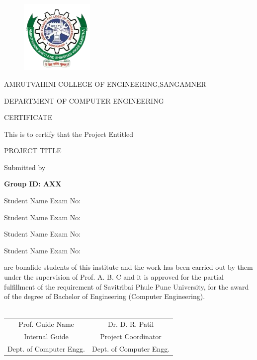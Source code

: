 \documentclass[oneside,a4paper,12pt]{report}
\begin{document}
\newpage



\begin{figure}[ht]
\centering
\includegraphics[width=100pt]{AVCOE_LOGO.png}
\end{figure}


{\bfseries \fontsize{14}{12} \selectfont \centerline{AMRUTVAHINI COLLEGE OF ENGINEERING,SANGAMNER}
\centerline{DEPARTMENT OF COMPUTER ENGINEERING}
\vspace*{1\baselineskip}} 


{\bfseries \fontsize{16}{12} \selectfont \centerline{CERTIFICATE} 
\vspace*{1\baselineskip}} 

\centerline{This is to certify that the Project Entitled}
\vspace*{1\baselineskip} 


{\bfseries \fontsize{14}{12} \selectfont \centerline{PROJECT TITLE}
\vspace*{1\baselineskip}}

\centerline{Submitted by}
\vspace*{1\baselineskip}
\centerline{\bf{Group ID: AXX}}  
\centerline{Student Name  \hspace{25 mm} Exam No: } 
\centerline{Student Name \hspace{25 mm} Exam No:  } 
\centerline{Student Name \hspace{25 mm} Exam No: }
\centerline{Student Name \hspace{25 mm} Exam No: }
\vspace*{1\baselineskip} 
are bonafide students of this institute and the work has been carried out by them under the supervision of  Prof. A. B. C and it is approved for the partial fulfillment of the requirement of Savitribai Phule Pune University, for the award of the degree of Bachelor of Engineering (Computer Engineering). \\\\
\bgroup
\def\arraystretch{0.7}
\begin{tabular}{c c }
Prof. Guide Name &  \hspace{50 mm} Dr. D. R. Patil \\								
Internal Guide   &  \hspace{50 mm} Project Coordinator \\
Dept. of Computer Engg.  &	\hspace{50 mm}Dept. of Computer Engg.  \\
\end{tabular}
 \vspace*{1.5\baselineskip}                     
                                                   
\end{document}
